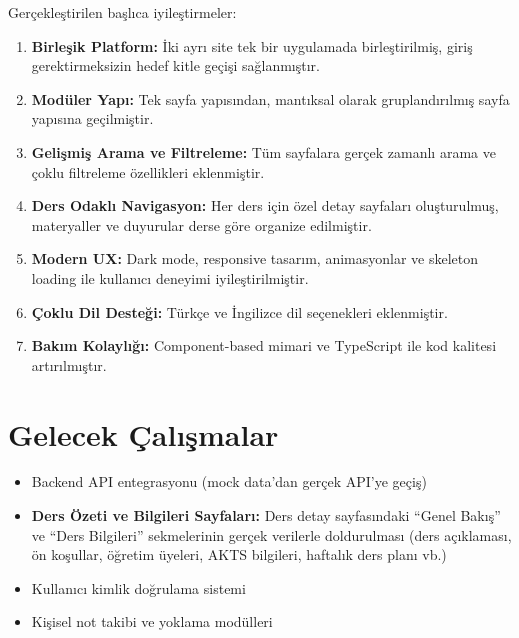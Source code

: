\documentclass[12pt,a4paper]{article}
\begin{document}
Gerçekleştirilen başlıca iyileştirmeler:

\begin{enumerate}
    \item \textbf{Birleşik Platform:} İki ayrı site tek bir uygulamada birleştirilmiş, giriş gerektirmeksizin hedef kitle geçişi sağlanmıştır.
    
    \item \textbf{Modüler Yapı:} Tek sayfa yapısından, mantıksal olarak gruplandırılmış sayfa yapısına geçilmiştir.
    
    \item \textbf{Gelişmiş Arama ve Filtreleme:} Tüm sayfalara gerçek zamanlı arama ve çoklu filtreleme özellikleri eklenmiştir.
    
    \item \textbf{Ders Odaklı Navigasyon:} Her ders için özel detay sayfaları oluşturulmuş, materyaller ve duyurular derse göre organize edilmiştir.
    
    \item \textbf{Modern UX:} Dark mode, responsive tasarım, animasyonlar ve skeleton loading ile kullanıcı deneyimi iyileştirilmiştir.
    
    \item \textbf{Çoklu Dil Desteği:} Türkçe ve İngilizce dil seçenekleri eklenmiştir.
    
    \item \textbf{Bakım Kolaylığı:} Component-based mimari ve TypeScript ile kod kalitesi artırılmıştır.
\end{enumerate}

\section{Gelecek Çalışmalar}

\begin{itemize}
    \item Backend API entegrasyonu (mock data'dan gerçek API'ye geçiş)
    \item \textbf{Ders Özeti ve Bilgileri Sayfaları:} Ders detay sayfasındaki ``Genel Bakış'' ve ``Ders Bilgileri'' sekmelerinin gerçek verilerle doldurulması (ders açıklaması, ön koşullar, öğretim üyeleri, AKTS bilgileri, haftalık ders planı vb.)
    \item Kullanıcı kimlik doğrulama sistemi
    \item Kişisel not takibi ve yoklama modülleri
    
\end{itemize}
\end{document}
